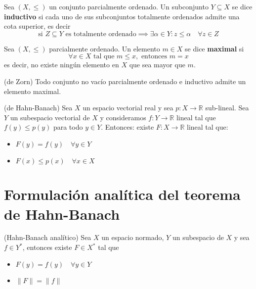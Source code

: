 \documentclass[12pt]{book}
\begin{document}
\begin{definicion}
    Sea $(X, \leq)$ un conjunto parcialmente ordenado. Un subconjunto $Y \subseteq X$ se dice \textbf{inductivo} si cada uno de sus subconjuntos totalmente ordenados admite una cota superior, es decir
    \begin{equation*}
        \text{si } Z \subseteq Y \text{ es totalmente ordenado} \implies \exists \alpha \in Y : z \leq \alpha \quad \forall z \in Z
    \end{equation*}
\end{definicion}

\begin{definicion}
    Sea $(X, \leq)$ parcialmente ordenado. Un elemento $m \in X$ se dice \textbf{maximal} si 
    \begin{equation*}
        \forall x \in X \text{ tal que } m \leq x, \text{ entonces } m = x
    \end{equation*}
    es decir, no existe ningún elemento en $X$ que sea mayor que $m$.
\end{definicion}


\begin{lema}(de Zorn)
    Todo conjunto no vacío parcialmente ordenado e inductivo admite un elemento maximal.
\end{lema}

\begin{teo}(de Hahn-Banach)
    Sea $X$ un espacio vectorial real y sea $p: X \to \mathbb{R}$ sub-lineal. Sea $Y$ un subespacio vectorial de $X$ y consideramos $f: Y \to \mathbb{R}$ lineal tal que $f(y) \leq p(y)$ para todo $y \in Y$. Entonces: existe $F: X \to \mathbb{R}$ lineal tal que:

    \begin{itemize}
        \item[i)] $F(y) = f(y) \quad \forall y \in Y$
        \item[ii)] $F(x) \leq p(x) \quad \forall x \in X$
    \end{itemize}
\end{teo}

\section{Formulación analítica del teorema de Hahn-Banach}

\begin{teo}(Hahn-Banach analítico)
    Sea $X$ un espacio normado, $Y$ un subespacio de $X$ y sea $f\in Y^*$, entonces existe $F \in X^*$ tal que \begin{itemize}
        \item [i)] $F(y) = f(y) \quad \forall y \in Y$
        \item [ii)] $\|F\| = \|f\|$
    \end{itemize}
\end{teo}
\end{document}
